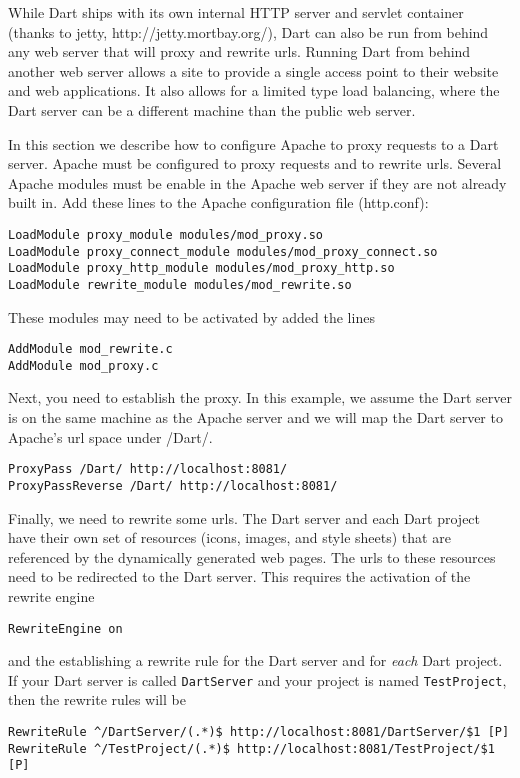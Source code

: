 \documentclass{InsightBook}
\begin{document}
While Dart ships with its own internal HTTP server and servlet
container (thanks to jetty, http://jetty.mortbay.org/), Dart can also
be run from behind any web server that will proxy and rewrite urls.
Running Dart from behind another web server allows a site to provide
a single access point to their website and web applications.  It also
allows for a limited type load balancing, where the Dart server can 
be a different machine than the public web server.

In this section we describe how to configure Apache to proxy requests
to a Dart server.  Apache must be configured to proxy requests and to 
rewrite urls.  Several Apache modules must be enable in the Apache
web server if they are not already built in. Add these lines to 
the Apache configuration file (http.conf):
\begin{verbatim}
LoadModule proxy_module modules/mod_proxy.so
LoadModule proxy_connect_module modules/mod_proxy_connect.so
LoadModule proxy_http_module modules/mod_proxy_http.so
LoadModule rewrite_module modules/mod_rewrite.so
\end{verbatim}

These modules may need to be activated by added the lines
\begin{verbatim}
AddModule mod_rewrite.c
AddModule mod_proxy.c
\end{verbatim}

Next, you need to establish the proxy.  In this example, we assume the
Dart server is on the same machine as the Apache server and we will map
the Dart server to Apache's url space under /Dart/.
\begin{verbatim}
ProxyPass /Dart/ http://localhost:8081/
ProxyPassReverse /Dart/ http://localhost:8081/
\end{verbatim}

Finally, we need to rewrite some urls.  The Dart server and each Dart project have their own set of
resources (icons, images, and style sheets) that are referenced by the
dynamically generated web pages.  The urls to these resources need to
be redirected to the Dart server.  This requires the activation of the rewrite engine
\begin{verbatim}
RewriteEngine on
\end{verbatim}

and the establishing a rewrite rule for the Dart server and for \emph{each} Dart project.  If your Dart server is called \texttt{DartServer} and your project is named \texttt{TestProject}, then the rewrite rules will be
\begin{verbatim}
RewriteRule ^/DartServer/(.*)$ http://localhost:8081/DartServer/$1 [P]
RewriteRule ^/TestProject/(.*)$ http://localhost:8081/TestProject/$1 [P]
\end{verbatim}
\end{document}
